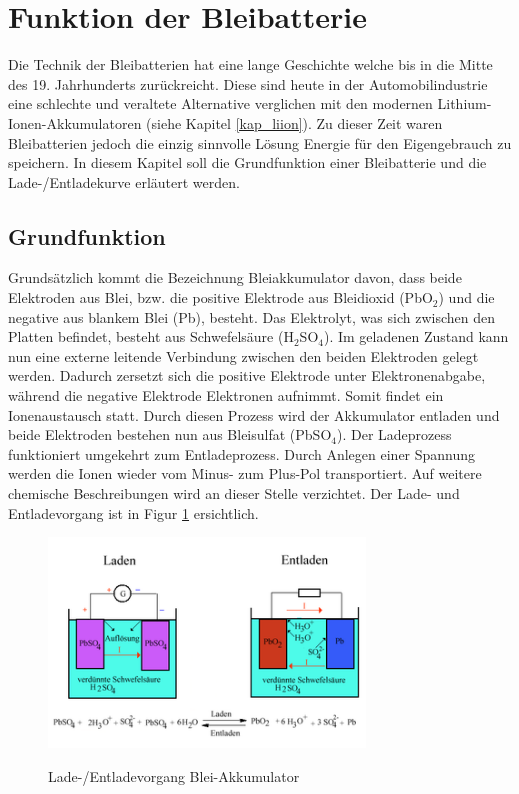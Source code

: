 \section{Funktion der Bleibatterie}

Die Technik der Bleibatterien hat eine lange Geschichte welche bis in die Mitte des 19. Jahrhunderts zurückreicht. Diese sind heute in der Automobilindustrie eine schlechte und veraltete Alternative verglichen mit den modernen Lithium-Ionen-Akkumulatoren (siehe Kapitel \ref{kap_liion}). Zu dieser Zeit waren Bleibatterien jedoch die einzig sinnvolle Lösung Energie für den Eigengebrauch zu speichern. In diesem Kapitel soll die Grundfunktion einer Bleibatterie und die Lade-/Entladekurve erläutert werden.

\subsection{Grundfunktion}

Grundsätzlich kommt die Bezeichnung Bleiakkumulator davon, dass beide Elektroden aus Blei, bzw. die positive Elektrode aus Bleidioxid (PbO$_2$) und die negative aus blankem Blei (Pb), besteht. Das Elektrolyt, was sich zwischen den Platten befindet, besteht aus Schwefelsäure (H$_2$SO$_4$). Im geladenen Zustand kann nun eine externe leitende Verbindung zwischen den beiden Elektroden gelegt werden. Dadurch zersetzt sich die positive Elektrode unter Elektronenabgabe, während die negative Elektrode Elektronen aufnimmt. Somit findet ein Ionenaustausch statt. Durch diesen Prozess wird der Akkumulator entladen und beide Elektroden bestehen nun aus Bleisulfat (PbSO$_4$). Der Ladeprozess funktioniert umgekehrt zum Entladeprozess. Durch Anlegen einer Spannung werden die Ionen wieder vom Minus- zum Plus-Pol transportiert. Auf weitere chemische Beschreibungen wird an dieser Stelle verzichtet. Der Lade- und Entladevorgang ist in Figur \ref{fig:pb_akku} ersichtlich.  \cite{pb_akku_funktion}

\begin{figure}[h!]
	\centering
		\includegraphics[width=0.75\textwidth]{images/pb_akku.PNG}
	\caption{Lade-/Entladevorgang Blei-Akkumulator}
	\label{fig:pb_akku}
	\cite{pb_akku_ent_lade}
\end{figure}

